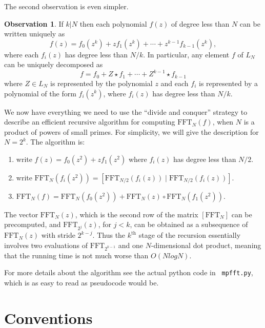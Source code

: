\documentclass[12pt, letterpaper, oneside]{amsart}
\theoremstyle{definition}
\newtheorem{observation}[para]{Observation}
\theoremstyle{plain}
\numberwithin{equation}{para}
\numberwithin{figure}{section}
\newcommand{\FFT}{\text{FFT}}
\renewcommand{\th}{\text{th}}
\begin{document}
The second observation is even simpler.
\begin{observation}\label{observation:decomposition}
If $k|N$ then each polynomial $f(z)$ of degree less than $N$ can be
written uniquely as
$$f(z) = f_0(z^k)+ zf_1(z^k) + \cdots + z^{k-1}f_{k-1}(z^k),$$
where each $f_i(z)$ has degree less than $N/k$.  In particular, any
element $f$ of $L_N$ can be uniquely decomposed as
$$f = f_0+ Z\star f_1 + \cdots + Z^{k-1}\star f_{k-1}$$
where $Z\in L_N$ is represented by the polynomial $z$ and each $f_i$
is represented by a polynomial of the form $f_i(z^k)$, where $f_i(z)$
has degree less than $N/k$.
\end{observation}

We now have everything we need to use the ``divide and conquer''
strategy to describe an efficient recursive algorithm for computing
$\FFT_N(f)$, when $N$ is a product of powers of small primes.  For
simplicity, we will give the description for $N = 2^k$.
The algorithm is:

\begin{enumerate}
\item write $f(z) = f_0(z^2)+ zf_1(z^2)$ where $f_i(z)$ has degree less than $N/2$.

\item write $\FFT_N(f_i(z^2)) = [\FFT_{N/2}(f_i(z)) \;|\; \FFT_{N/2}(f_i(z))]$.

\item $\FFT_N(f) = \FFT_{N}(f_0(z^2)) + \FFT_{N}(z)\circ\FFT_{N}(f_1(z^2))$.
\end{enumerate}

The vector $\FFT_N(z)$, which is the second row of the matrix $[\FFT_N]$ can be
precomputed, and $\FFT_{2^j}(z)$, for $j < k$, can be obtained as a subsequence
of $\FFT_N(z)$ with stride $2^{k-j}$.  Thus the $k^\th$ stage of the recursion
essentially involves two evaluations of $\FFT_{2^{k-1}}$ and one $N$-dimensional
dot product, meaning that the running time is not much worse than $O(Nlog N)$.

For more details about the algorithm see the actual python code in {\tt
  mpfft.py}, which is as easy to read as pseudocode would be.

\section{Conventions}
\end{document}
